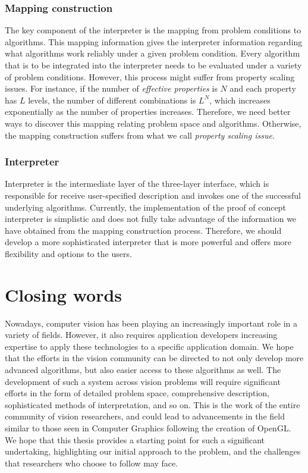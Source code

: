 \subsubsection{Mapping construction}
The key component of the interpreter is the mapping from problem conditions to algorithms. This mapping information gives the interpreter information regarding what algorithms work reliably under a given problem condition. Every algorithm that is to be integrated into the interpreter needs to be evaluated under a variety of problem conditions. However, this process might suffer from property scaling issues. For instance, if the number of \textit{effective properties} is $N$ and each property has $L$ levels, the number of different combinations is $L^N$, which increases exponentially as the number of properties increases. Therefore, we need better ways to discover this mapping relating problem space and algorithms. Otherwise, the mapping construction suffers from what we call \textit{property scaling issue}.

\subsubsection{Interpreter}
Interpreter is the intermediate layer of the three-layer interface, which is responsible for receive user-specified description and invokes one of the successful underlying algorithms. Currently, the implementation of the proof of concept interpreter is simplistic and does not fully take advantage of the information we have obtained from the mapping construction process. Therefore, we should develop a more sophisticated interpreter that is more powerful and offers more flexibility and options to the users.

\section{Closing words}
Nowadays, computer vision has been playing an increasingly important role in a variety of fields. However, it also requires application developers increasing expertise to apply these technologies to a specific application domain. We hope that the efforts in the vision community can be directed to not only develop more advanced algorithms, but also easier access to these algorithms as well. The development of such a system across vision problems will require significant efforts in the form of detailed problem space, comprehensive description, sophisticated methods of interpretation, and so on. This is the work of the entire community of vision researchers, and could lead to advancements in the field similar to those seen in Computer Graphics following the creation of OpenGL. We hope that this thesis provides a starting point for such a significant undertaking, highlighting our initial approach to the problem, and the challenges that researchers who choose to follow may face.